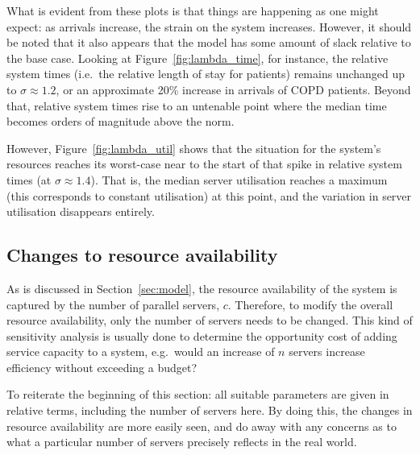What is evident from these plots is that things are happening as one might
expect: as arrivals increase, the strain on the system increases. However, it
should be noted that it also appears that the model has some amount of slack
relative to the base case. Looking at Figure~\ref{fig:lambda_time}, for
instance, the relative system times (i.e.\ the relative length of stay for
patients) remains unchanged up to \(\sigma \approx 1.2\), or an approximate 20\%
increase in arrivals of COPD patients. Beyond that, relative system times rise
to an untenable point where the median time becomes orders of magnitude above
the norm.

However, Figure~\ref{fig:lambda_util} shows that the situation for the system's
resources reaches its worst-case near to the start of that spike in relative
system times (at \(\sigma \approx 1.4\)). That is, the median server utilisation
reaches a maximum (this corresponds to constant utilisation) at this point, and
the variation in server utilisation disappears entirely.


\subsection{Changes to resource availability}\label{subsec:resources}

As is discussed in Section~\ref{sec:model}, the resource availability of the
system is captured by the number of parallel servers, \(c\). Therefore, to
modify the overall resource availability, only the number of servers needs to be
changed. This kind of sensitivity analysis is usually done to determine the
opportunity cost of adding service capacity to a system, e.g.\ would an increase
of \(n\) servers increase efficiency without exceeding a budget?

To reiterate the beginning of this section: all suitable parameters are given in
relative terms, including the number of servers here. By doing this, the
changes in resource availability are more easily seen, and do away with any
concerns as to what a particular number of servers precisely reflects in the
real world.

